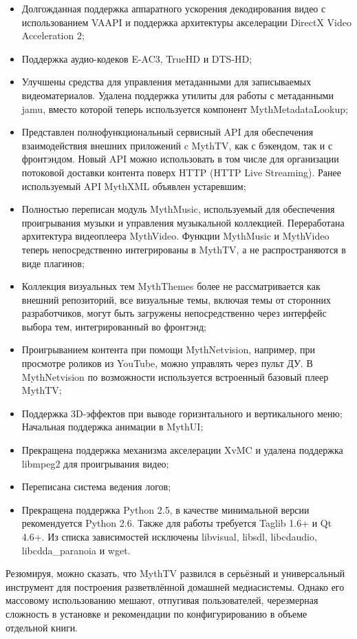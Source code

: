 \documentclass[10pt, a5paper]{article}
\begin{document}
\begin{itemize}
  \item Долгожданная поддержка аппаратного ускорения декодирования видео с использованием VAAPI и поддержка архитектуры акселерации DirectX Video Acceleration 2;
  \item Поддержка аудио-кодеков E-AC3, TrueHD и DTS-HD;
  \item Улучшены средства для управления метаданными для записываемых видеоматериалов. Удалена поддержка утилиты для работы с метаданными jamu, вместо которой теперь используется компонент MythMetadataLookup;
  \item Представлен полнофункциональный сервисный API для обеспечения взаимодействия внешних приложений c MythTV, как с бэкендом, так и с фронтэндом. Новый API можно использовать в том числе для организации потоковой доставки контента поверх HTTP (HTTP Live Streaming). Ранее используемый API MythXML объявлен устаревшим;
  \item Полностью переписан модуль MythMusic, используемый для обеспечения проигрывания музыки и управления музыкальной коллекцией. Переработана архитектура видеоплеера \linebreak MythVideo. Функции MythMusic и MythVideo теперь непосредственно интегрированы в MythTV, а не распространяются в виде плагинов;
  \item Коллекция визуальных тем MythThemes более не рассматривается как внешний репозиторий, все визуальные темы, включая темы от сторонних разработчиков,  могут быть загружены непосредственно через интерфейс выбора тем, интегрированный во фронтэнд;
  \item Проигрыванием контента при помощи MythNetvision, например, при просмотре роликов из YouTube, можно управлять через пульт ДУ. В MythNetvision по возможности используется встроенный базовый плеер MythTV;
  \item Поддержка 3D-эффектов при выводе горизнтального и вертикального меню; 
Начальная поддержка анимации в MythUI;
  \item Прекращена поддержка механизма акселерации XvMC и удалена поддержка libmpeg2 для проигрывания видео;
  \item Переписана система ведения логов;
  \item Прекращена поддержка Python 2.5, в качестве минимальной версии рекомендуется Python 2.6. Также для работы требуется Taglib 1.6+ и Qt 4.6+. Из списка зависимостей исключены libvisual, libsdl, libcdaudio, libcdda\_paranoia и wget.
\end{itemize}

Резюмируя, можно сказать, что MythTV развился в серьёзный и универсальный инструмент для построения разветвлённой домашней медиасистемы. Однако его массовому использованию мешают, отпугивая пользователей,  черезмерная  сложность в установке и рекомендации по конфигурированию в объеме отдельной книги.
\end{document}

